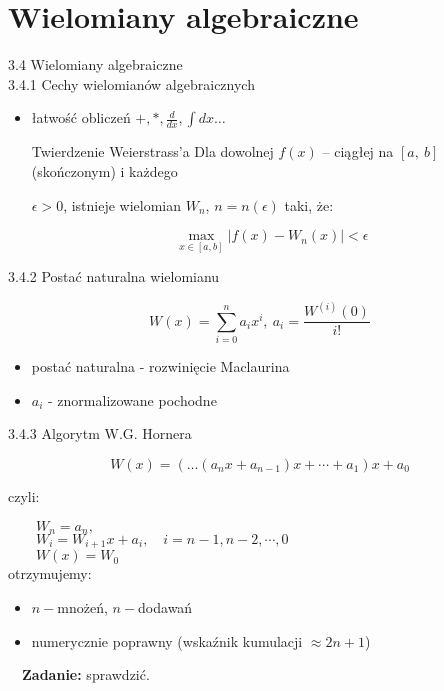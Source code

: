 \section{Wielomiany algebraiczne}
	\begin{frame}{3.4 Wielomiany algebraiczne \\ 3.4.1 Cechy wielomianów algebraicznych}


	\begin{itemize}
	\item łatwość obliczeń $+, *, \displaystyle \frac{d}{dx}, \displaystyle \int dx\ldots $ \newline


    \begin{block}{Twierdzenie Weierstrass'a}
    Dla dowolnej $f(x)$ -- ciągłej na $[a,\ b]$ (skończonym) i każdego

    $\epsilon>0$, istnieje wielomian $W_{n}$, $n=n(\epsilon)$ taki, że:

	\[ \max\limits_{x \in [a,b]}|f(x)-W_{n}(x)|<\epsilon \]


  	\end{block}
    \end{itemize}

	\end{frame}

    \begin{frame}{3.4.2 Postać naturalna wielomianu}
    \begin{block}{}
		$$W(x)=\sum_{i=0}^{n}a_{i}x^{i},\ a_{i}=\frac{W^{(i)}(0)}{i!}$$
    \end{block}
        \begin{itemize}
        \item postać naturalna - rozwinięcie Maclaurina \\

        \item $a_{i}$ - znormalizowane pochodne
		\end{itemize}
    \end{frame}

    \begin{frame}{3.4.3 Algorytm W.G. Hornera}
    \setlength\parindent{24pt}
	\begin{block}{}
		$$W(x)=(\ldots(a_{n}x+a_{n-1})x+\cdots+a_{1})x+a_{0}$$
	\end{block}
	czyli:

	$\qquad W_{n}=a_{n},$ \\

	$\qquad W_{i}=W_{i+1}x+a_{i}, \quad i=n-1, n-2, \cdots , 0$ \\

	$\qquad W(x)=W_{0}$ \\

	otrzymujemy:
	\begin{itemize}
	\item $n-$mnożeń, $n -$dodawań
	\item numerycznie poprawny (wskaźnik kumulacji $\approx 2n+1$)
	\end{itemize}
    \vspace{3mm}
	$\quad$\textbf{Zadanie:} sprawdzić.
    \end{frame}

